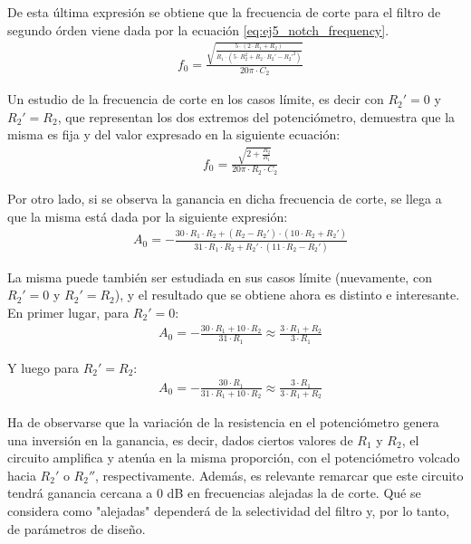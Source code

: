 De esta última expresión se obtiene que la frecuencia de corte para el filtro de segundo órden viene dada por la ecuación \ref{eq:ej5_notch_frequency}.
\begin{align}
    &f_0 = \frac{\sqrt{\frac{5 \cdot \left(2 \cdot R_1 + R_2\right)}{R_1 \cdot \left(5 \cdot R_2^2 + R_2 \cdot R_2' - R_2'^2\right)}}}{20 \pi \cdot C_2}
    \label{eq:ej5_notch_frequency}
\end{align}

Un estudio de la frecuencia de corte en los casos límite, es decir con $R_2' = 0$ y $R_2' = R_2$, que representan los dos extremos del potenciómetro, 
demuestra que la misma es fija y del valor expresado en la siguiente ecuación:
\begin{align}
    &f_0 = \frac{\sqrt{2 + \frac{R_2}{R_1}}}{20 \pi \cdot R_2 \cdot C_2}
    \label{eq:ej5_notch_frequency_limit_cases}
\end{align}

Por otro lado, si se observa la ganancia en dicha frecuencia de corte, se llega a que la misma está dada por la siguiente expresión:
\begin{align}
    &A_0 = - \frac{30 \cdot R_1 \cdot R_2 + \left(R_2 - R_2'\right) \cdot \left(10 \cdot R_2 + R_2'\right)}{31 \cdot R_1 \cdot R_2 + R_2' \cdot \left(11 \cdot R_2 - R_2'\right)}
    \label{eq:ej5_system_gain}
\end{align}

La misma puede también ser estudiada en sus casos límite (nuevamente, con $R_2' = 0$ y $R_2' = R_2$), y el resultado que se obtiene ahora es distinto e interesante.
En primer lugar, para $R_2' = 0$:
\begin{align}
    &A_0 = - \frac{30 \cdot R_1 + 10 \cdot R_2}{31 \cdot R_1} \approx \frac{3 \cdot R_1 + R_2}{3 \cdot R_1}
    \label{eq:ej5_system_gain_for_R2'_0}
\end{align}

Y luego para $R_2' = R_2$:
\begin{align}
    &A_0 = - \frac{30 \cdot R_1}{31 \cdot R_1 + 10 \cdot R_2} \approx \frac{3 \cdot R_1}{3 \cdot R_1 + R_2}
    \label{eq:ej5_system_gain_for_R2'_R2}
\end{align}

Ha de observarse que la variación de la resistencia en el potenciómetro genera una inversión en la ganancia, es decir, dados ciertos valores de $R_1$ y $R_2$, 
el circuito amplifica y atenúa en la misma proporción, con el potenciómetro volcado hacia $R_2'$ o $R_2''$, respectivamente.
Además, es relevante remarcar que este circuito tendrá ganancia cercana a 0 dB en frecuencias alejadas la de corte.
Qué se considera como "alejadas" dependerá de la selectividad del filtro y, por lo tanto, de parámetros de diseño.



